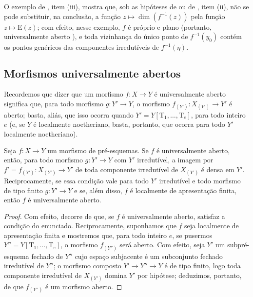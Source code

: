 \begin{remark}[14.2.7]
\label{IV.14.2.7}
O exemplo de , item (iii), mostra que, sob as hipóteses de  ou de , item (ii), não se pode substituir, na conclusão, a função $z\mapsto\dim(f^{-1}(z))$ pela função $z\mapsto\mathrm{E}(z)$; com efeito, nesse exemplo, $f$ é próprio e plano (portanto, universalmente aberto ), e toda vizinhança do único ponto de $f^{-1}(y_0)$ contém os pontos genéricos das componentes irredutíveis de $f^{-1}(\eta)$.
\end{remark}

\subsection{Morfismos universalmente abertos}
\label{subsection:IV.14.3}
\label{IV.14.3}

\begin{env}[14.3.1]
\label{IV.14.3.1}
Recordemos  que dizer que um morfismo $f:X\to Y$ é universalmente aberto significa que, para todo morfismo $g:Y'\to Y$, o morfismo $f_{(Y')}:X_{(Y')}\to Y'$ é aberto; basta, aliás, que isso ocorra quando $Y'=Y[\mathrm{T}_1,\ldots,\mathrm{T}_e]$, para todo inteiro $e$  (e, se $Y$ é localmente noetheriano, basta, portanto, que ocorra para todo $Y'$ localmente noetheriano).
\end{env}

\begin{proposition}[14.3.2]
\label{IV.14.3.2}
Seja $f:X\to Y$ um morfismo de pré-esquemas.
Se $f$ é universalmente aberto, então, para todo morfismo $g:Y'\to Y$ com $Y'$ irredutível, a imagem por $f'=f_{(Y')}:X_{(Y')}\to Y'$ de toda componente irredutível de $X_{(Y')}$ é densa em $Y'$.
Reciprocamente, se essa condição vale para todo $Y'$ irredutível e todo morfismo de tipo finito $g:Y'\to Y$ e se, além disso, $f$ é localmente de apresentação finita, então $f$ é universalmente aberto.
\end{proposition}

\begin{proof}
Com efeito, decorre de  que, se $f$ é universalmente aberto, satisfaz a condição do enunciado.
Reciprocamente, suponhamos que $f$ seja localmente de apresentação finita e mostremos que, para todo inteiro $e$, se pusermos $Y''=Y[\mathrm{T}_1,\ldots,\mathrm{T}_e]$, o morfismo $f_{(Y'')}$ será aberto.
Com efeito, seja $Y'$ um subpré-esquema fechado de $Y''$ cujo espaço subjacente é um subconjunto fechado irredutível de $Y''$; o morfismo composto $Y'\to Y''\to Y$ é de tipo finito, logo toda componente irredutível de $X_{(Y')}$ domina $Y'$ por hipótese; deduzimos, portanto, de  que $f_{(Y'')}$ é um morfismo aberto.
\end{proof}

